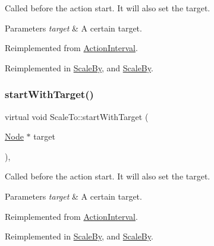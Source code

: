 Called before the action start. It will also set the target.


\begin{DoxyParams}{Parameters}
{\em target} & A certain target. \\
\hline
\end{DoxyParams}


Reimplemented from \hyperlink{classActionInterval_ad3d91186b2c3108488ddbbdbbd982484}{Action\+Interval}.



Reimplemented in \hyperlink{classScaleBy_a161a68e7e1e9278f6f937d67cc3d27b1}{Scale\+By}, and \hyperlink{classScaleBy_a1212167a4e86b3a8087e72602698d50e}{Scale\+By}.

\mbox{\label{classScaleTo_ae2f7b7aaaf43d55a2c5bdce80d02887c}} 
\subsubsection{\texorpdfstring{start\+With\+Target()}{startWithTarget()}\hspace{0.1cm}{\footnotesize\ttfamily [2/2]}}
{\footnotesize\ttfamily virtual void Scale\+To\+::start\+With\+Target (\begin{DoxyParamCaption}\item[{\hyperlink{classNode}{Node} $\ast$}]{target }\end{DoxyParamCaption})\hspace{0.3cm}{\ttfamily [override]}, {\ttfamily [virtual]}}

Called before the action start. It will also set the target.


\begin{DoxyParams}{Parameters}
{\em target} & A certain target. \\
\hline
\end{DoxyParams}


Reimplemented from \hyperlink{classActionInterval_ad3d91186b2c3108488ddbbdbbd982484}{Action\+Interval}.



Reimplemented in \hyperlink{classScaleBy_a161a68e7e1e9278f6f937d67cc3d27b1}{Scale\+By}, and \hyperlink{classScaleBy_a1212167a4e86b3a8087e72602698d50e}{Scale\+By}.

\mbox{\label{classScaleTo_ac3678e85987891e4cc2e9d612569541c}} 
